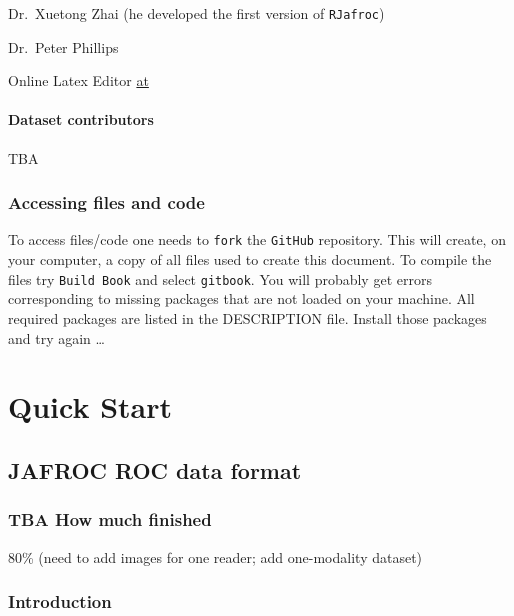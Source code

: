 \documentclass[
]{book}
\begin{document}
Dr.~Xuetong Zhai (he developed the first version of \texttt{RJafroc})

Dr.~Peter Phillips

Online Latex Editor \href{https://latexeditor.lagrida.com/}{at}

\hypertarget{quick-start-index-dataset-contributors}{%
\subsection{Dataset contributors}\label{quick-start-index-dataset-contributors}}

TBA

\hypertarget{quick-start-index-how-to-access-files}{%
\section{Accessing files and code}\label{quick-start-index-how-to-access-files}}

To access files/code one needs to \texttt{fork} the \texttt{GitHub} repository. This will create, on your computer, a copy of all files used to create this document. To compile the files try \texttt{Build\ Book} and select \texttt{gitbook}. You will probably get errors corresponding to missing packages that are not loaded on your machine. All required packages are listed in the DESCRIPTION file. Install those packages and try again \ldots{}

\hypertarget{part-quick-start}{%
\part*{Quick Start}\label{part-quick-start}}

\hypertarget{quick-start-data-format}{%
\chapter{JAFROC ROC data format}\label{quick-start-data-format}}

\hypertarget{quick-start-data-format-how-much-finished}{%
\section{TBA How much finished}\label{quick-start-data-format-how-much-finished}}

80\% (need to add images for one reader; add one-modality dataset)

\hypertarget{quick-start-data-format-intro}{%
\section{Introduction}\label{quick-start-data-format-intro}}
\end{document}

